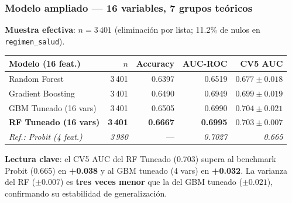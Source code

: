 \begin{frame}
\frametitle{Modelo ampliado — 16 variables, 7 grupos teóricos}
\small
\textbf{Muestra efectiva}: $n = 3\,401$ (eliminación por lista; 11.2\% de nulos en \texttt{regimen\_salud}).

\vspace{0.25cm}
\centering
\scriptsize
\begin{tabular}{lrrrr}
\toprule
Modelo (16 feat.) & $n$ & Accuracy & AUC-ROC & CV5 AUC \\
\midrule
Random Forest          & 3\,401 & 0.6397 & 0.6519 & $0.677 \pm 0.018$ \\
Gradient Boosting      & 3\,401 & 0.6490 & 0.6949 & $0.699 \pm 0.019$ \\
GBM Tuneado (16 vars)  & 3\,401 & 0.6505 & 0.6990 & $0.704 \pm 0.021$ \\
\textbf{RF Tuneado (16 vars)}   & \textbf{3\,401} & \textbf{0.6667} & \textbf{0.6995} & $\mathbf{0.703 \pm 0.007}$ \\
\midrule
\textit{Ref.: Probit (4 feat.)} & \textit{3\,980} & — & \textit{0.7027} & \textit{0.665} \\
\bottomrule
\end{tabular}

\vspace{0.3cm}
\flushleft
\scriptsize
\textbf{Lectura clave}: el CV5 AUC del RF Tuneado (0.703) supera al benchmark Probit (0.665) en \textbf{+0.038} y al GBM tuneado (4 vars) en \textbf{+0.032}. La varianza del RF ($\pm 0.007$) es \textbf{tres veces menor} que la del GBM tuneado ($\pm 0.021$), confirmando su estabilidad de generalización.
\end{frame}

